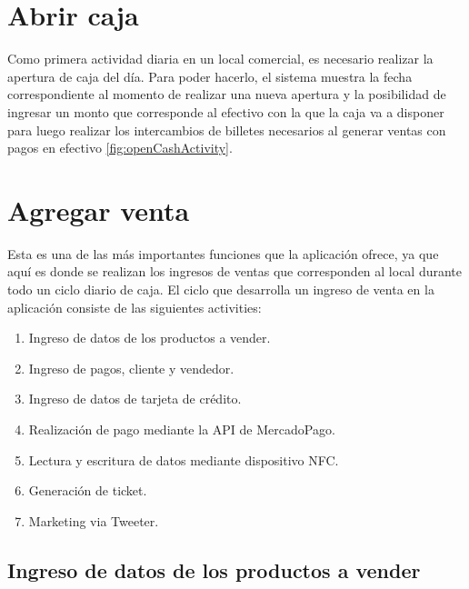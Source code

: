 
\section{Abrir caja}
\label{sec:ui.newcash}

Como primera actividad diaria en un local comercial, es necesario realizar la apertura de caja del d\'ia. Para poder hacerlo, el sistema muestra la fecha correspondiente al momento de realizar una nueva apertura y la posibilidad de ingresar un monto que corresponde al efectivo con la que la caja va a disponer para luego realizar los intercambios de billetes necesarios al generar ventas con pagos en efectivo \ref{fig:openCashActivity}.


\section{Agregar venta}
\label{sec:ui.addsale}

Esta es una de las m\'as importantes funciones que la aplicaci\'on ofrece, ya que aqu\'i es donde se realizan los ingresos de ventas que corresponden al local durante todo un ciclo diario de caja. El ciclo que desarrolla un ingreso de venta en la aplicaci\'on consiste de las siguientes activities:

\begin{enumerate}
\item Ingreso de datos de los productos a vender.
\item Ingreso de pagos, cliente y vendedor.
\item Ingreso de datos de tarjeta de cr\'edito.
\item Realizaci\'on de pago mediante la \ac{API} de MercadoPago.
\item Lectura y escritura de datos mediante dispositivo \ac{NFC}.
\item Generaci\'on de ticket.
\item Marketing via Tweeter.
\end{enumerate}


\subsection{Ingreso de datos de los productos a vender}
\label{subsec:ui.addsale.products}

